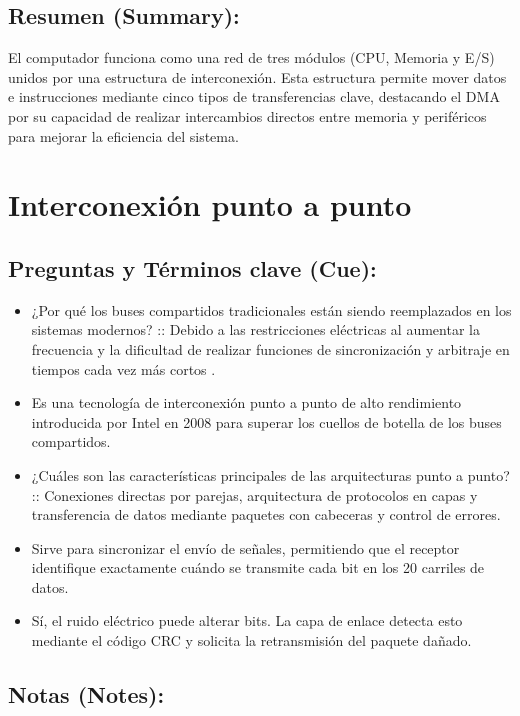 \documentclass{article}
\begin{document}
\subsection{Resumen (Summary):}
\label{sec:orgf6a8f91}
El computador funciona como una red de tres módulos (CPU, Memoria y
E/S) unidos por una estructura de interconexión. Esta estructura
permite mover datos e instrucciones mediante cinco tipos de
transferencias clave, destacando el DMA por su capacidad de realizar
intercambios directos entre memoria y periféricos para mejorar la
eficiencia del sistema. 


\section{Interconexión punto a punto}
\label{sec:org465b6e7}
\subsection{Preguntas y Términos clave (Cue):}
\label{sec:orgd5255ac}
\begin{itemize}
\item ¿Por qué los buses compartidos tradicionales están siendo
reemplazados en los sistemas modernos? :: Debido a las restricciones
eléctricas al aumentar la frecuencia y la dificultad de realizar
funciones de sincronización y arbitraje en tiempos cada vez más
cortos .
\item[{QPI (QuickPath Interconnect)}] Es una tecnología de interconexión
punto a punto de alto rendimiento introducida por Intel en 2008 para
superar los cuellos de botella de los buses compartidos.
\item ¿Cuáles son las características principales de las arquitecturas
punto a punto? :: Conexiones directas por parejas, arquitectura de
protocolos en capas y transferencia de datos mediante paquetes con
cabeceras y control de errores.
\item[{¿Para qué sirve el carril de reloj en QPI?}] Sirve para sincronizar
el envío de señales, permitiendo que el receptor identifique
exactamente cuándo se transmite cada bit en los 20 carriles de
datos.
\item[{¿Puede haber pérdida de bits? ¿En qué casos?}] Sí, el ruido
eléctrico puede alterar bits. La capa de enlace detecta esto
mediante el código CRC y solicita la retransmisión del paquete
dañado.
\end{itemize}

\subsection{Notas (Notes):}
\label{sec:org00d3ca1}
\end{document}
